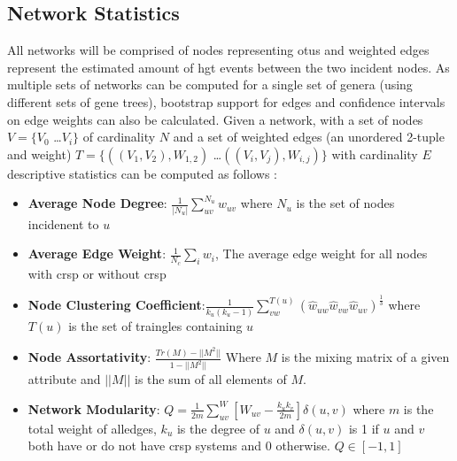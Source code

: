 \subsection{Network Statistics}
All networks will be comprised of nodes representing \ac{otu}s and weighted edges represent the estimated amount of \ac{hgt} events between the two incident nodes.
As multiple sets of networks can be computed for a single set of genera (using different sets of gene trees), bootstrap support for edges and confidence intervals on edge weights can also be calculated.
Given a network, with a set of nodes $V = \{V_0$ \dots $V_i\}$ of cardinality $N$ and a set of weighted edges (an unordered 2-tuple and weight) $T = \{((V_1,V_2),W_{1,2})$ \dots $((V_i,V_j),W_{i,j})\}$ with cardinality $E$ descriptive statistics can be computed as follows \citep{netstat}:
    \begin{itemize}
        \item \textbf{Average Node Degree}: $\frac{1}{|N_u|}\sum_{uv}^{N_u} w_{uv}$ where $N_u$ is the set of nodes incidenent to $u$
        \item \textbf{Average Edge Weight}: $\frac{1}{N_c}\sum_i w_i$, The average edge weight for all nodes with \ac{crsp} or without \ac{crsp}
        \item \textbf{Node Clustering Coefficient}:$\frac{1}{k_u(k_u-1)} \sum_{vw}^{T(u)} (\hat{w}_{uw} \hat{w}_{vw} \hat{w}_{uv})^{\frac{1}{3}}$ where $T(u)$ is the set of traingles containing $u$ \citep{clustering}
        \item \textbf{Node Assortativity}: $\frac{Tr(M)-||M^2||}{1-||M^2||}$ Where $M$ is the mixing matrix of a given attribute and $||M||$ is the sum of all elements of $M$.\citep{newmanmix}
        \item \textbf{Network Modularity}: $Q=\frac{1}{2m}\sum_{uv}^W [W_{uv} - \frac{k_u k_v}{2m}]\delta(u,v)$ where $m$ is the total weight of alledges, $k_u$ is the degree of $u$ and $\delta(u,v)$ is 1 if $u$ and $v$ both have or do not have \ac{crsp} systems and 0 otherwise. $Q \in [-1,1]$ \citep{modularity}
    \end{itemize}
